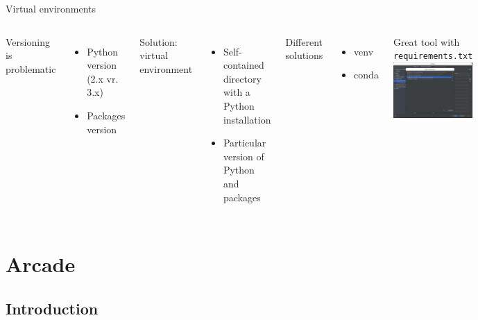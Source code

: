 \documentclass[10pt,compress]{beamer} %
\begin{document}
\begin{frame}{Virtual environments}
	\begin{columns}
            Versioning is problematic
            \begin{itemize}
                \item Python version (2.x vr. 3.x)
                \item Packages version
            \end{itemize}
            Solution: \alert{virtual environment}
            \begin{itemize}
                \item Self-contained directory with a Python installation
                \item Particular version of Python and packages
            \end{itemize}
        	Different solutions
            \begin{itemize}
                \item venv
                \item conda
            \end{itemize}
            Great tool with \texttt{requirements.txt}
	        \includegraphics[width=\linewidth]{figs/venv.png}\\
	\end{columns}
\end{frame}

\section{Arcade}
\subsection{Introduction}
\end{document}
